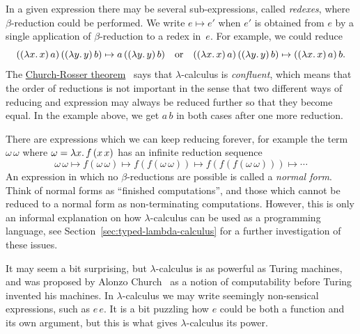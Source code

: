 In a given expression there may be several sub-expressions, called
\emph{redexes}, where $\beta$-reduction could be performed. We write
$e \mapsto e'$ when $e'$ is obtained from $e$ by a single application
of $\beta$-reduction to a redex in~$e$. For example, we could reduce
%
\begin{equation*}
  ((\lambda x .\,x)\, a)\,((\lambda y .\,y)\,b) \mapsto
  a\, ((\lambda y .\,y)\,b)
  \quad\text{or}\quad
  ((\lambda x .\,x)\, a)\,((\lambda y .\,y)\,b) \mapsto
  ((\lambda x .\,x)\, a)\, b.
\end{equation*}
%
The \href{http://en.wikipedia.org/wiki/Church%E2%80%93Rosser_theorem}{Church-Rosser theorem}~\cite{church36:_some_proper_of_conver} says that
$\lambda$-calculus is \emph{confluent}, which means that the order of
reductions is not important in the sense that two different ways of
reducing and expression may always be reduced further so that they
become equal. In the example above, we get $a\,b$ in both cases after
one more reduction.

There are expressions which we can keep reducing forever, for example
the term $\omega\,\omega$ where $\omega = \lambda x .\,f\,(x\,x)$ has an
infinite reduction sequence
%
\begin{equation*}
  \omega\, \omega \mapsto
  f(\omega\, \omega) \mapsto 
  f(f(\omega\, \omega)) \mapsto 
  f(f(f(\omega\, \omega))) \mapsto
  \cdots
\end{equation*}
%
An expression in which no $\beta$-reductions are possible is called a
\emph{normal form}. Think of normal forms as ``finished
computations'', and those which cannot be reduced to a normal form as
non-terminating computations. However, this is only an informal
explanation on how $\lambda$-calculus can be used as a programming
language, see Section~\ref{sec:typed-lambda-calculus} for a
further investigation of these issues.

It may seem a bit surprising, but $\lambda$-calculus is as powerful as
Turing machines, and was proposed by Alonzo Church~\cite{church32:_set_of_postul_for_found_of_logic} as a
notion of computability before Turing invented his machines. In
$\lambda$-calculus we may write seemingly non-sensical expressions,
such as $e\, e$. It is a bit puzzling how $e$ could be both a function
and its own argument, but this is what gives $\lambda$-calculus its
power.

